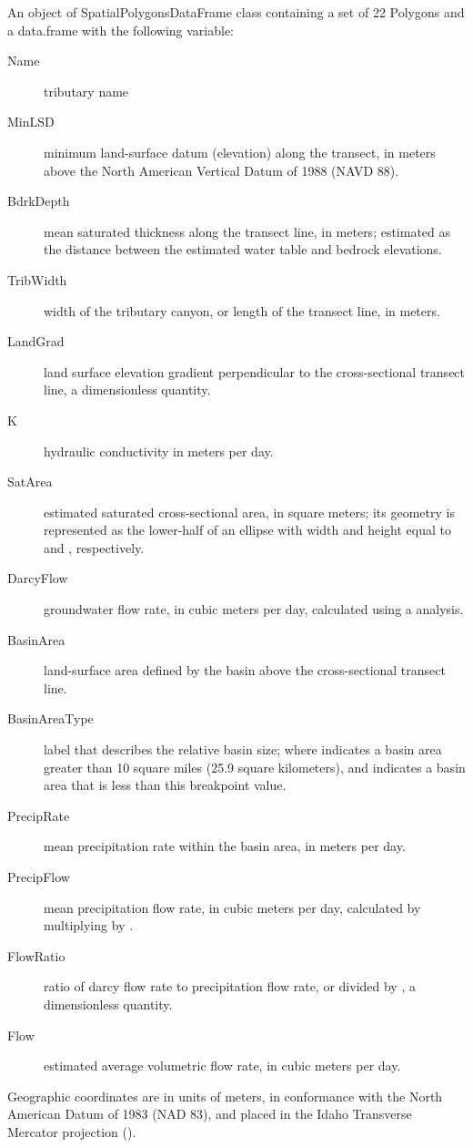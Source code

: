 \documentclass[a4paper]{book}
\begin{document}
\begin{Format}
An object of SpatialPolygonsDataFrame class containing a set of 22 Polygons and a
data.frame with the following variable:
\begin{description}

\item[Name] tributary name
\item[MinLSD] minimum land-surface datum (elevation) along the transect,
in meters above the North American Vertical Datum of 1988 (NAVD 88).
\item[BdrkDepth] mean saturated thickness along the transect line, in meters;
estimated as the distance between the estimated water table and bedrock elevations.
\item[TribWidth] width of the tributary canyon, or length of the transect line, in meters.
\item[LandGrad] land surface elevation gradient perpendicular to the
cross-sectional transect line, a dimensionless quantity.
\item[K] hydraulic conductivity in meters per day.
\item[SatArea] estimated saturated cross-sectional area, in square meters;
its geometry is represented as the lower-half of an ellipse with
width and height equal to  and , respectively.
\item[DarcyFlow] groundwater flow rate, in cubic meters per day, calculated using a
 analysis.
\item[BasinArea] land-surface area defined by the basin above the cross-sectional transect line.
\item[BasinAreaType] label that describes the relative basin size; where
 indicates a basin area greater than 10 square miles (25.9 square kilometers), and
 indicates a basin area that is less than this breakpoint value.
\item[PrecipRate] mean precipitation rate within the basin area, in meters per day.
\item[PrecipFlow] mean precipitation flow rate, in cubic meters per day,
calculated by multiplying  by .
\item[FlowRatio] ratio of darcy flow rate to precipitation flow rate,
or  divided by , a dimensionless quantity.
\item[Flow] estimated average volumetric flow rate, in cubic meters per day.

\end{description}

Geographic coordinates are in units of meters, in conformance with the
North American Datum of 1983 (NAD 83), and placed in the
Idaho Transverse Mercator projection ().
\end{Format}
\end{document}

